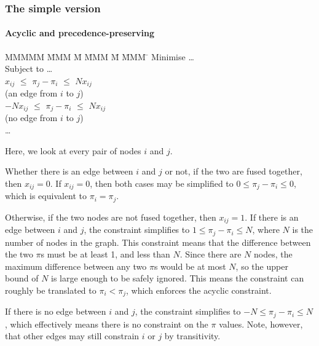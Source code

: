 \subsubsection{The simple version}
\paragraph{Acyclic and precedence-preserving}

\begin{tabbing}
MMMMM   \= MMM \= M \= MMM \= M \= MMM \= \kill
Minimise   \> \ldots \\
Subject to \> \ldots \\
           \>    $x_{ij}$ \> $\le$ \> $\pi_j - \pi_i$ \> $\le$ \> $N x_{ij}$ \\
           \>             (an edge from $i$ to $j$)            \\
           \> $-N x_{ij}$ \> $\le$ \> $\pi_j - \pi_i$ \> $\le$ \> $N x_{ij}$ \\
           \>             (no edge from $i$ to $j$)            \\
           \> \ldots
\end{tabbing}
Here, we look at every pair of nodes $i$ and $j$.

Whether there is an edge between $i$ and $j$ or not, if the two are fused together, then $x_{ij} = 0$.
If $x_{ij} = 0$, then both cases may be simplified to $0 \le \pi_j - \pi_i \le 0$, which is equivalent to $\pi_i = \pi_j$.

Otherwise, if the two nodes are not fused together, then $x_{ij} = 1$.
If there is an edge between $i$ and $j$, the constraint simplifies to $1 \le \pi_j - \pi_i \le N$, where $N$ is the number of nodes in the graph.
This constraint means that the difference between the two $\pi$s must be at least 1, and less than $N$.
Since there are $N$ nodes, the maximum difference between any two $\pi$s would be at most $N$, so the upper bound of $N$ is large enough to be safely ignored.
This means the constraint can roughly be translated to $\pi_i < \pi_j$, which enforces the acyclic constraint.

If there is no edge between $i$ and $j$, the constraint simplifies to $-N \le \pi_j - \pi_i \le N$, which effectively means there is no constraint on the $\pi$ values.
Note, however, that other edges may still constrain $i$ or $j$ by transitivity.


